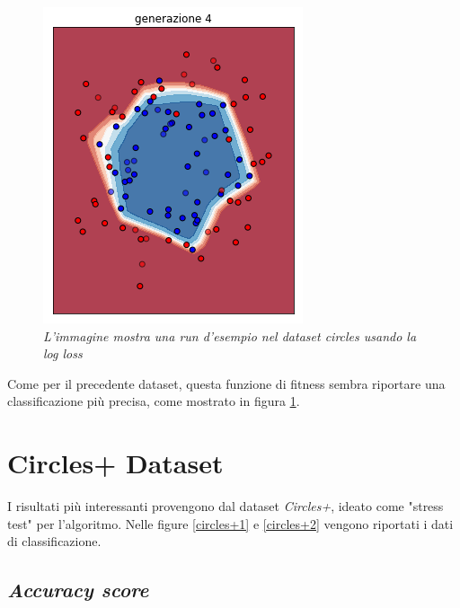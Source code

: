 \documentclass[12pt,a4paper]{report}
\begin{document}
\begin{figure}[H]
 \includegraphics[scale = 0.3]{images/circle-rnd-log/4}
 \caption{\textit{L'immagine mostra una run d'esempio nel dataset circles usando la log loss}}
 \label{circles2}
\end{figure}

Come per il precedente dataset, questa funzione di fitness sembra riportare una classificazione più precisa, come mostrato in figura \ref{circles2}.

\section{Circles+ Dataset}

I risultati più interessanti provengono dal dataset \textit{Circles+}, ideato come "stress test" per l'algoritmo. Nelle figure \ref{circles+1} e \ref{circles+2} vengono riportati i dati di classificazione.

\subsection{\textit{Accuracy score}}
\end{document}
